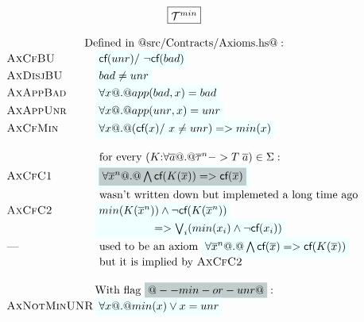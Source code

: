 
\begin{figure}
{\small
\[\setlength{\arraycolsep}{1pt}
\begin{array}{c}
\ruleform{\ThMin} \\ \\
\begin{array}{lll}
 \multicolumn{2}{c}{\mbox{Defined in @src/Contracts/Axioms.hs@}:} \\
 \textsc{AxCfBU}    & \formula{\lcf{\unr} /\ \lncf{\bad}} \\
 \textsc{AxDisjBU}  & \formula{\bad \neq \unr} \\
 \textsc{AxAppBad}  & \formula{\forall x @.@ app(\bad,x) = \bad} \\
 \textsc{AxAppUnr}  & \formula{\forall x @.@ app(\unr,x) = \unr} \\

 \textsc{AxCfMin} & \formula{\forall x @.@ (\lcf{x} /\ x \neq unr) => min(x)} \\
 \\
                 & \text{ for every } (K{:}\forall\as @.@ \oln{\tau}{n} -> T\;\as) \in \Sigma : \\
 \textsc{AxCfC1} & \formula{\highlight{\forall \oln{x}{n} @.@ \bigwedge \lcf{K(\ol{x})} => \lcf{\ol{x}}}} \\
                 & \text{ wasn't written down but implemeted a long time ago } \\
 \textsc{AxCfC2} & \formula{min(K(\oln{x}{n}))\land\neg\lcf{K(\oln{x}{n})}} \\
                 & \formula{\quad\qquad\qquad  => \bigvee_i (min(x_i)\land\neg\lcf{x_i})} \\
 \textsc{---}    & \text{ used to be an axiom } \formula{\forall \oln{x}{n} @.@ \bigwedge\lcf{\ol{x}} => \lcf{K(\ol{x})}} \\
                 & \text{ but it is implied by } \textsc{AxCfC2} \\

 \\
 \multicolumn{2}{c}{\mbox{With flag \highlight{@--min-or-unr@}}:} \\
 \textsc{AxNotMinUNR} & \formula{\forall x @.@ min(x) \lor x = \unr} \\


\end{array}
\end{array}\]}
\end{figure}
